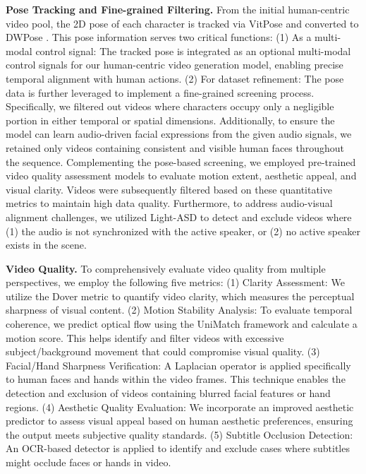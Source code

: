\textbf{Pose Tracking and Fine-grained Filtering.}  From the initial human-centric video pool, the 2D pose of each character is tracked via VitPose \cite{vitpose} and converted to DWPose \cite{dwpose}. This pose information serves two critical functions: (1) As a multi-modal control signal: The tracked pose is integrated as an optional multi-modal control signals for our human-centric video generation model, enabling precise temporal alignment with human actions. (2) For dataset refinement: The pose data is further leveraged to implement a fine-grained screening process. Specifically, we filtered out videos where characters occupy only a negligible portion in either temporal or spatial dimensions. Additionally, to ensure the model can learn audio-driven facial expressions from the given audio signals, we retained only videos containing consistent and visible human faces throughout the sequence.
Complementing the pose-based screening, we employed pre-trained video quality assessment models to evaluate motion extent, aesthetic appeal, and visual clarity. Videos were subsequently filtered based on these quantitative metrics to maintain high data quality. Furthermore, to address audio-visual alignment challenges, we utilized Light-ASD \cite{light-asd} to detect and exclude videos where (1) the audio is not synchronized with the active speaker, or (2) no active speaker exists in the scene.

\textbf{Video Quality.} To comprehensively evaluate video quality from multiple perspectives, we employ the following five metrics: (1) Clarity Assessment: We utilize the Dover metric \cite{dover} to quantify video clarity, which measures the perceptual sharpness of visual content. (2) Motion Stability Analysis: To evaluate temporal coherence, we predict optical flow using the UniMatch framework \cite{unimatch} and calculate a motion score. This helps identify and filter videos with excessive subject/background movement that could compromise visual quality. (3) Facial/Hand Sharpness Verification: A Laplacian operator is applied specifically to human faces and hands within the video frames. This technique enables the detection and exclusion of videos containing blurred facial features or hand regions. (4) Aesthetic Quality Evaluation: We incorporate an improved aesthetic predictor \cite{improved-aesthetic-predictor} to assess visual appeal based on human aesthetic preferences, ensuring the output meets subjective quality standards. (5) Subtitle Occlusion Detection: An OCR-based detector is applied to identify and exclude cases where subtitles might occlude faces or hands in video.

